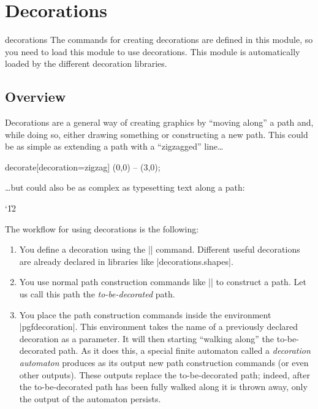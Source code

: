 %
%
%

\section{Decorations}
\label{section-base-snakes-and-decorations}


\begin{pgfmodule}{decorations}
  The commands for creating decorations are defined in this
  module, so you need to load this module to use decorations. This
  module is automatically loaded by the different decoration
  libraries. 
\end{pgfmodule}


\subsection{Overview}

Decorations are a general way of creating graphics by ``moving along''
a path and, while doing so, either drawing something or constructing a
new path. This could be as simple as extending a path with a
``zigzagged'' line\ldots 

\begin{codeexample}[]
\tikz \draw decorate[decoration=zigzag] {(0,0) -- (3,0)};
\end{codeexample}
\ldots but could also be as complex as typesetting text along a path:
{\catcode`\|12
}

The workflow for using decorations is the following:
\begin{enumerate}
\item You define a decoration using the |\pgfdeclaredecoration|
  command. Different useful decorations are already declared in
  libraries like |decorations.shapes|.
\item You use normal path construction commands like |\pgfpathlineto|
  to construct a path. Let us call this path the
  \emph{to-be-decorated} path.
\item You place the path construction commands inside the environment
  |{pgfdecoration}|. This environment takes the name of a previously
  declared decoration as a parameter. It will then starting ``walking
  along'' the to-be-decorated path. As it does this, a special finite
  automaton called a \emph{decoration automaton} produces as its
  output new path construction commands (or even other outputs). These
  outputs replace the to-be-decorated path; indeed, after the
  to-be-decorated path has been fully walked along it is thrown away,
  only the output of the automaton persists.
\end{enumerate}

